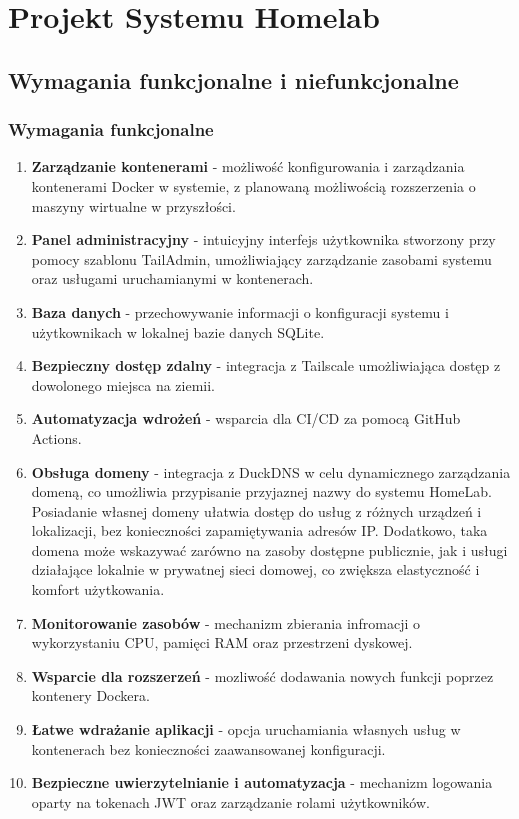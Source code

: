 \chapter{Projekt Systemu Homelab}

\section{Wymagania funkcjonalne i niefunkcjonalne}

\subsection{Wymagania funkcjonalne}

\begin{enumerate}
    \item \textbf{Zarządzanie kontenerami} - możliwość konfigurowania i zarządzania kontenerami Docker w systemie, z planowaną możliwością rozszerzenia o maszyny wirtualne w przyszłości.
    \item \textbf{Panel administracyjny} - intuicyjny interfejs użytkownika stworzony przy pomocy szablonu TailAdmin\cite{TailAdmin}, umożliwiający zarządzanie zasobami systemu oraz usługami uruchamianymi w kontenerach.
    \item \textbf{Baza danych} - przechowywanie informacji o konfiguracji systemu i użytkownikach w lokalnej bazie danych SQLite.
    \item \textbf{Bezpieczny dostęp zdalny} - integracja z Tailscale umożliwiająca dostęp z dowolonego miejsca na ziemii.
    \item \textbf{Automatyzacja wdrożeń} - wsparcia dla CI/CD za pomocą GitHub Actions.
    \item \textbf{Obsługa domeny} - integracja z DuckDNS w celu dynamicznego zarządzania domeną, co umożliwia przypisanie przyjaznej nazwy do systemu HomeLab. Posiadanie własnej domeny ułatwia dostęp do usług z różnych urządzeń i lokalizacji, bez konieczności zapamiętywania adresów IP. Dodatkowo, taka domena może wskazywać zarówno na zasoby dostępne publicznie, jak i usługi działające lokalnie w prywatnej sieci domowej, co zwiększa elastyczność i komfort użytkowania.
    \item \textbf{Monitorowanie zasobów} - mechanizm zbierania infromacji o wykorzystaniu CPU, pamięci RAM oraz przestrzeni dyskowej.
    \item \textbf{Wsparcie dla rozszerzeń} - mozliwość dodawania nowych funkcji poprzez kontenery Dockera.
    \item \textbf{Łatwe wdrażanie aplikacji} - opcja uruchamiania własnych usług w kontenerach bez konieczności zaawansowanej konfiguracji.
\item \textbf{Bezpieczne uwierzytelnianie i automatyzacja} - mechanizm logowania oparty na tokenach JWT oraz zarządzanie rolami użytkowników.
\end{enumerate}

